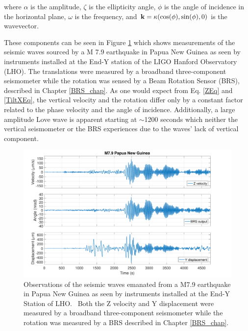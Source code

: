 \documentclass [12pt, proquest]{uwthesis}[2019]
\begin{document}
where $\alpha$ is the amplitude, $\zeta$ is the ellipticity angle, $\phi$ is the angle of incidence in the horizontal plane, $\omega$ is the frequency, and $\bf{k}=\kappa (\cos(\phi),\sin(\phi),\text{0})$ is the wavevector.

These components can be seen in Figure \ref{Earthquake} which shows measurements of the seismic waves sourced by a M 7.9 earthquake in Papua New Guinea as seen by instruments installed at the End-Y station of the LIGO Hanford Observatory (LHO). The translations were measured by a broadband three-component seismometer while the rotation was sensed by a Beam Rotation Sensor (BRS), described in Chapter \ref{BRS_chap}. As one would expect from Eq. \ref{ZEq} and \ref{TiltXEq}, the vertical velocity and the rotation differ only by a constant factor related to the phase velocity and the angle of incidence. Additionally, a large amplitude Love wave is apparent starting at $\sim$1200 seconds which neither the vertical seismometer or the BRS experiences due to the waves' lack of vertical component.

\begin{figure}%
\begin{center}
\includegraphics[width=\textwidth]{PNGTimeSeries.pdf}
\caption[Observations of the seismic waves by instruments installed at the End-Y Station of LHO]{Observations of the seismic waves emanated from a M7.9 earthquake in Papua New Guinea as seen by instruments installed at the End-Y Station of LHO.~\cite{tiltSeismology} Both the Z velocity and Y displacement were measured by a broadband three-component seismometer while the rotation was measured by a BRS described in Chapter \ref{BRS_chap}. }
\label{Earthquake}
\end{center}
\end{figure}
\end{document}
